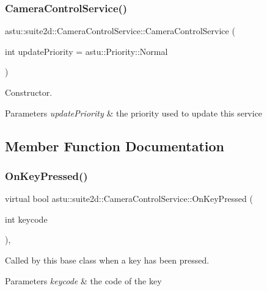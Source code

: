 \subsubsection{\texorpdfstring{Camera\+Control\+Service()}{CameraControlService()}}
{\footnotesize\ttfamily astu\+::suite2d\+::\+Camera\+Control\+Service\+::\+Camera\+Control\+Service (\begin{DoxyParamCaption}\item[{int}]{update\+Priority = {\ttfamily astu\+:\+:Priority\+:\+:Normal} }\end{DoxyParamCaption})}

Constructor.


\begin{DoxyParams}{Parameters}
{\em update\+Priority} & the priority used to update this service \\
\hline
\end{DoxyParams}


\subsection{Member Function Documentation}
\mbox{\label{classastu_1_1suite2d_1_1CameraControlService_aa0a09cd56307bfab4b410ed06ffa5c74}} 
\subsubsection{\texorpdfstring{On\+Key\+Pressed()}{OnKeyPressed()}}
{\footnotesize\ttfamily virtual bool astu\+::suite2d\+::\+Camera\+Control\+Service\+::\+On\+Key\+Pressed (\begin{DoxyParamCaption}\item[{int}]{keycode }\end{DoxyParamCaption})\hspace{0.3cm}{\ttfamily [override]}, {\ttfamily [virtual]}}

Called by this base class when a key has been pressed.


\begin{DoxyParams}{Parameters}
{\em keycode} & the code of the key \\
\hline
\end{DoxyParams}


